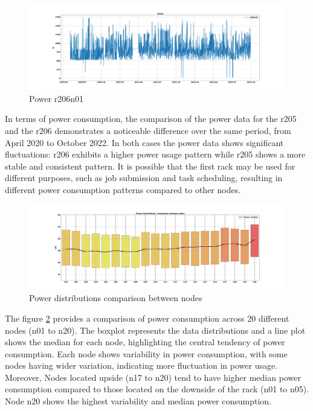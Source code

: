 \begin{figure}[H]
    \centering
    \includegraphics[width=1\textwidth]{Figures/PWR_r206n01.png}
    \caption{Power r206n01}
    \label{fig:PWR_r206n01}
\end{figure}

In terms of power consumption, the comparison of the power data for the r205 and the r206 demonstrates a noticeable difference over the same period, from April 2020 to October 2022.
In both cases the power data shows significant fluctuations: r206 exhibits a higher power usage pattern while r205 shows a more stable and consistent pattern.
It is possible that the first rack may be used for different purposes, such as job submission and task scheduling, resulting in different power consumption patterns compared to other nodes.

\begin{figure}[H]
    \centering
    \includegraphics[width=1\textwidth]{Figures/PWR_nodes_boxplot.png}
    \caption{Power distributions comparison between nodes}
    \label{fig:PWR_nodes_boxplot}
\end{figure}

The figure \ref{fig:PWR_nodes_boxplot} provides a comparison of power consumption across 20 different nodes (n01 to n20).
The boxplot represents the data distributions and a line plot shows the median for each node, highlighting the central tendency of power consumption.
Each node shows variability in power consumption, with some nodes having wider variation, indicating more fluctuation in power usage.
Moreover, Nodes located upside (n17 to n20) tend to have higher median power consumption compared to those located on the downside of the rack (n01 to n05). Node n20 shows the highest variability and median power consumption.

